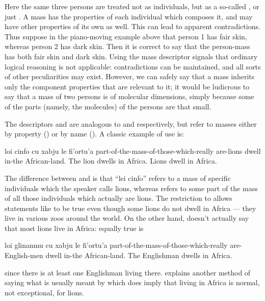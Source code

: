 Here the same three persons are treated not as individuals, but
    as a so-called , or just . A mass has
    the properties of each individual which composes it, and may
    have other properties of its own as well. This can lead to
    apparent contradictions. Thus suppose in the piano-moving
    example above that person 1 has fair skin, whereas person 2 has
    dark skin. Then it is correct to say that the person-mass has
    both fair skin and dark skin. Using the mass descriptor 
    signals that ordinary logical reasoning is not applicable:
    contradictions can be maintained, and all sorts of other
    peculiarities may exist. However, we can safely say that a mass
    inherits only the component properties that are relevant to it;
    it would be ludicrous to say that a mass of two persons is of
    molecular dimensions, simply because some of the parts (namely,
    the molecules) of the persons are that small. 

The descriptors  and  are analogous to 
    and  respectively, but refer to masses either by property
    () or by name (). A classic example of 
    use is:
\begin{example}
loi cinfo cu xabju le fi'ortu'a\n
part-of-the-mass-of-those-which-really are-lions\n
\T	dwell in-the African-land.\n
The lion dwells in Africa.\n
Lions dwell in Africa.
\end{example}

The difference between  and  is that ``lei
    cinfo'' refers to a mass of specific individuals which the
    speaker calls lions, whereas  refers to some part
    of the mass of all those individuals which actually are lions.
    The restriction to  allows statements
    like  to be true even though
    some lions do not dwell in Africa --- they live in various zoos
    around the world. On the other hand,  doesn't actually say that most lions live in Africa:
    equally true is
\begin{example}
loi glinanmu cu xabju le fi'ortu'a\n
part-of-the-mass-of-those-which-really are-English-men\n
\T	dwell in-the African-land.\n
The Englishman dwells in Africa.
\end{example}

{\noindent}since there is at least one Englishman living there.  explains another method of saying what
    is usually meant by  which does
    imply that living in Africa is normal, not exceptional, for
    lions. 

